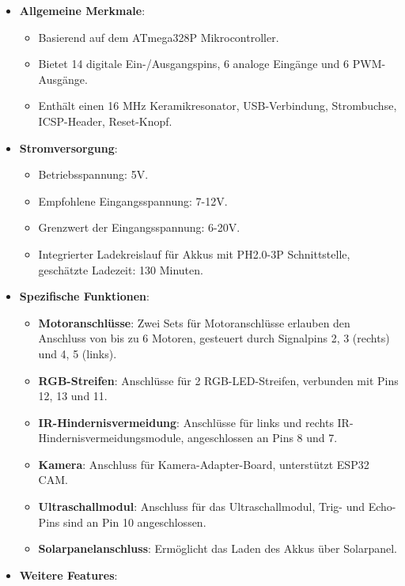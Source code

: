 \documentclass{vorlage-design-main}
\begin{document}
\begin{itemize}

\item
  \textbf{Allgemeine Merkmale}:

  \begin{itemize}
  
  \item
    Basierend auf dem ATmega328P Mikrocontroller.
  \item
    Bietet 14 digitale Ein-/Ausgangspins, 6 analoge Eingänge und 6
    PWM-Ausgänge.
  \item
    Enthält einen 16 MHz Keramikresonator, USB-Verbindung, Strombuchse,
    ICSP-Header, Reset-Knopf.
  \end{itemize}
\item
  \textbf{Stromversorgung}:

  \begin{itemize}
  
  \item
    Betriebsspannung: 5V.
  \item
    Empfohlene Eingangsspannung: 7-12V.
  \item
    Grenzwert der Eingangsspannung: 6-20V.
  \item
    Integrierter Ladekreislauf für Akkus mit PH2.0-3P Schnittstelle,
    geschätzte Ladezeit: 130 Minuten.
  \end{itemize}
\item
  \textbf{Spezifische Funktionen}:

  \begin{itemize}
  
  \item
    \textbf{Motoranschlüsse}: Zwei Sets für Motoranschlüsse erlauben den
    Anschluss von bis zu 6 Motoren, gesteuert durch Signalpins 2, 3
    (rechts) und 4, 5 (links).
  \item
    \textbf{RGB-Streifen}: Anschlüsse für 2 RGB-LED-Streifen, verbunden
    mit Pins 12, 13 und 11.
  \item
    \textbf{IR-Hindernisvermeidung}: Anschlüsse für links und rechts
    IR-Hindernisvermeidungsmodule, angeschlossen an Pins 8 und 7.
  \item
    \textbf{Kamera}: Anschluss für Kamera-Adapter-Board, unterstützt
    ESP32 CAM.
  \item
    \textbf{Ultraschallmodul}: Anschluss für das Ultraschallmodul, Trig-
    und Echo-Pins sind an Pin 10 angeschlossen.
  \item
    \textbf{Solarpanelanschluss}: Ermöglicht das Laden des Akkus über
    Solarpanel.
  \end{itemize}
\item
  \textbf{Weitere Features}:


\end{itemize}
\end{document}
